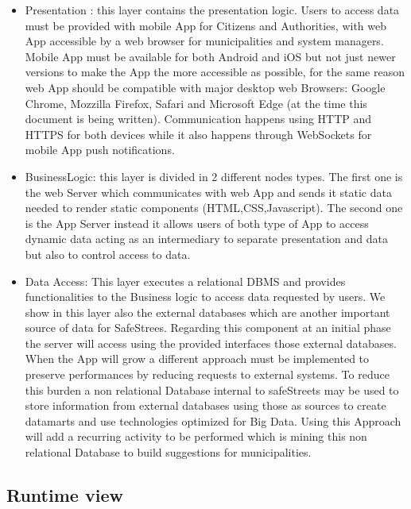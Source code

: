 \begin{itemize}
\item Presentation :  this layer contains the presentation logic. Users to access data must be provided
with mobile App for Citizens and Authorities, with web App accessible by a web browser for
municipalities and system managers. Mobile App must be available for both Android and iOS but
not just newer versions to make the App the more accessible as possible, for the same reason web
App should be compatible with major desktop web Browsers: Google Chrome, Mozzilla Firefox,
Safari and Microsoft Edge (at the time this document is being written). Communication happens
using HTTP and HTTPS for both devices while it also happens through WebSockets for mobile
App push notifications.
\item BusinessLogic: this layer is divided in 2 different nodes types. The first one is the web Server which communicates with web App and sends it static data needed to render static components (HTML,CSS,Javascript). The second one is the App Server instead it allows users of both type of App to access dynamic data acting as an intermediary to separate presentation and data but also to control access to data.
\item Data Access: This layer executes a relational DBMS and provides functionalities to the Business
logic to access data requested by users. We show in this layer also the external databases which
are another important source of data for SafeStrees. Regarding this component at an initial phase
the server will access using the provided interfaces those external databases. When the App will grow a different approach must be implemented to preserve performances by reducing requests to
external systems. To reduce this burden a non relational Database internal to safeStreets may be
used to store information from external databases using those as sources to create datamarts and
use technologies optimized for Big Data. Using this Approach will add a recurring activity to be
performed which is mining this non relational Database to build suggestions for municipalities.
\end{itemize}
\newpage
\subsection{Runtime view}
